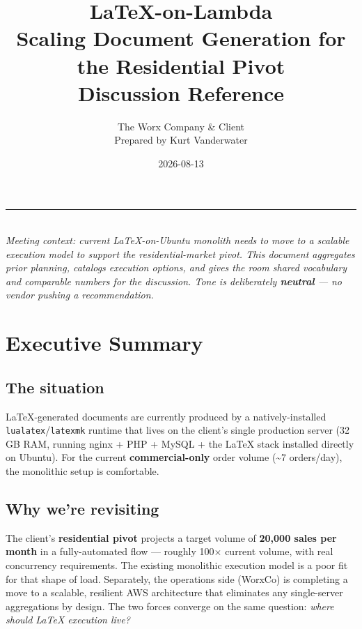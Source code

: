 \documentclass[11pt,letterpaper]{article}
\title{\vspace{-2cm}\textbf{LaTeX-on-Lambda}\\[0.4em]\large Scaling Document Generation for the Residential Pivot\\[0.6em]\normalsize Discussion Reference}
\author{The Worx Company \& Client\\Prepared by Kurt Vanderwater}
\date{2026-08-13}
\begin{document}
\maketitle

\vspace{-1em}
\begin{center}
\rule{0.6\linewidth}{0.4pt}\\
\vspace{0.6em}
\small\emph{Meeting context: current LaTeX-on-Ubuntu monolith needs to move to a scalable execution model to support the residential-market pivot. This document aggregates prior planning, catalogs execution options, and gives the room shared vocabulary and comparable numbers for the discussion. Tone is deliberately \textbf{neutral} --- no vendor pushing a recommendation.}
\end{center}

\vspace{1em}
\tableofcontents
\newpage

\section{Executive Summary}
\label{sec:exec-summary}

\subsection{The situation}
LaTeX-generated documents are currently produced by a natively-installed \texttt{lualatex}/\texttt{latexmk} runtime that lives on the client's single production server (32 GB RAM, running nginx + PHP + MySQL + the LaTeX stack installed directly on Ubuntu). For the current \textbf{commercial-only} order volume (\textasciitilde 7 orders/day), the monolithic setup is comfortable.

\subsection{Why we're revisiting}
The client's \textbf{residential pivot} projects a target volume of \textbf{20{,}000 sales per month} in a fully-automated flow --- roughly 100$\times$ current volume, with real concurrency requirements. The existing monolithic execution model is a poor fit for that shape of load. Separately, the operations side (WorxCo) is completing a move to a scalable, resilient AWS architecture that eliminates any single-server aggregations by design. The two forces converge on the same question: \emph{where should LaTeX execution live?}
\end{document}
